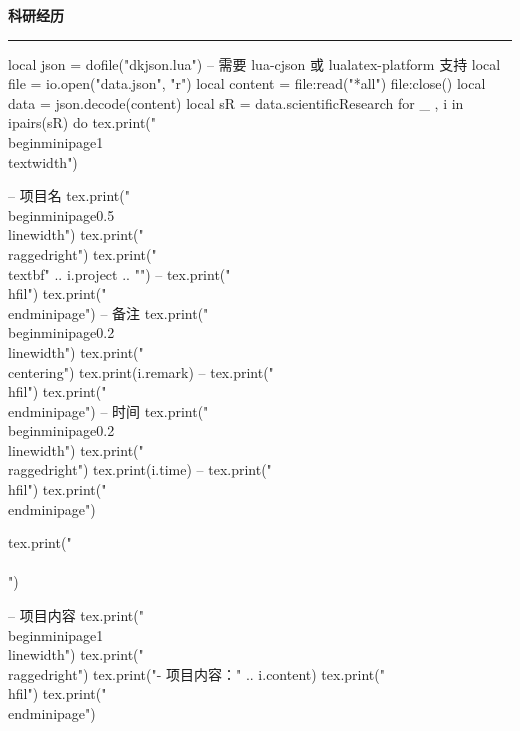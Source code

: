 \documentclass[10pt, a4paper, oneside]{ctexart}
\begin{document}
\ifdefined\scientificResearch
\begin{minipage}{1\textwidth}
    \large{\textbf{科研经历}}
\end{minipage}
\rule{\linewidth}{\lineSize}
\begin{center}
    \begin{minipage}{0.9\textwidth}
        \begin{luacode}
            local json = dofile("dkjson.lua")  -- 需要 lua-cjson 或 lualatex-platform 支持
            local file = io.open("data.json", "r")
            local content = file:read("*all")
            file:close()
            local data = json.decode(content)
            local sR = data.scientificResearch
            for _ , i in ipairs(sR) do
                tex.print("\\begin{minipage}{1\\textwidth}")

                -- 项目名
                tex.print("\\begin{minipage}{0.5\\linewidth}")
                tex.print("\\raggedright")
                tex.print("\\textbf{" .. i.project .. "}")
                -- tex.print("\\hfil")
                tex.print("\\end{minipage}")
                -- 备注
                tex.print("\\begin{minipage}{0.2\\linewidth}")
                tex.print("\\centering")
                tex.print(i.remark)
                -- tex.print("\\hfil")
                tex.print("\\end{minipage}")
                -- 时间
                tex.print("\\begin{minipage}{0.2\\linewidth}")
                tex.print("\\raggedright")
                tex.print(i.time)
                -- tex.print("\\hfil")
                tex.print("\\end{minipage}")

                tex.print("\\\\[0.8em]")

                -- 项目内容
                tex.print("\\begin{minipage}{1\\linewidth}")
                tex.print("\\raggedright")
                tex.print("- 项目内容：" .. i.content)
                tex.print("\\hfil")
                tex.print("\\end{minipage}")


\end{luacode}
\end{minipage}
\end{center}
\end{document}
